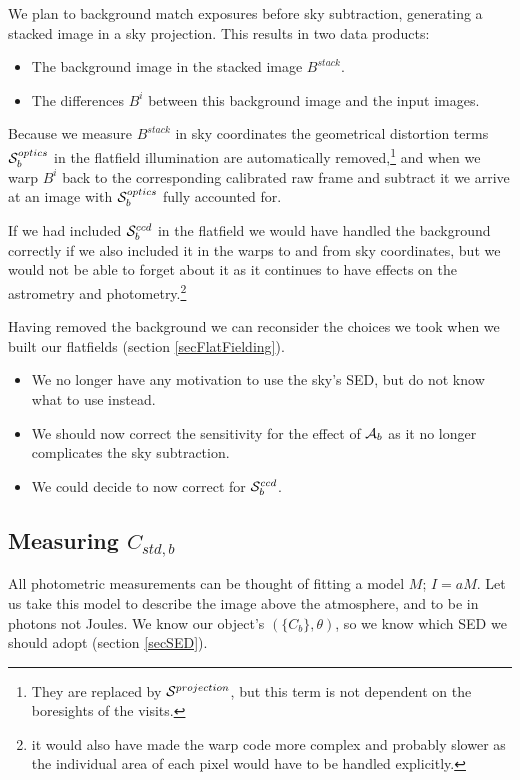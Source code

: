 \documentclass[12pt]{article}
\newcommand{\additive}{{\cal A}}
\newcommand{\qe}{{\cal S}}
\begin{document}
We plan to background match exposures before sky subtraction, generating a stacked image in a sky projection.
This results in two data products:
\begin{itemize}
\item The background image in the stacked image $B^{stack}$.
\item The differences $B^i$ between this background image and the input images.
\end{itemize}
Because we measure $B^{stack}$ in sky coordinates the geometrical distortion terms $\qe_b^{optics}$ in
the flatfield illumination are automatically removed,\footnote{They are replaced by $\qe^{projection}$,
  but this term is not dependent on the boresights of the visits.}
and when we warp $B^i$ back to the corresponding
calibrated raw frame and subtract it we arrive at an image with $\qe_b^{optics}$ fully accounted for.

If we had included $\qe_b^{ccd}$ in the flatfield we would have handled the background correctly if we also
included it in the warps to and from sky coordinates, but we would not be able to forget about it as it
continues to have effects on the astrometry and photometry.\footnote{ it would also have made the warp code
  more complex and probably slower as the individual area of each pixel would have to be handled explicitly.
}

Having removed the background we can reconsider the choices we took when we built our flatfields
(section \ref{secFlatFielding}).
\begin{itemize}
  \item We no longer have any motivation to use the sky's SED, but do not know what to use instead.
  \item We should now correct the sensitivity for the effect of $\additive_b$ as it no longer complicates
    the sky subtraction.
  \item We could decide to now correct for $\qe_b^{ccd}$.
\end{itemize}

\subsection{Measuring $C_{std, b}$}

All photometric measurements can be thought of fitting a model $M$; $I = a M$.  Let us take this
model to describe the image above the atmosphere, and to be in photons not Joules.
We know our object's $(\{C_b\}, \theta)$, so we know which SED we should adopt (section \ref{secSED}).
\end{document}
